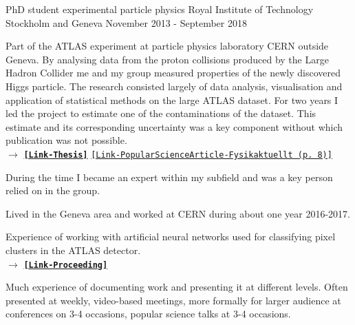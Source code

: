 


\begin{cventries}


\cventry
{PhD student experimental particle physics} %
{Royal Institute of Technology} %
{Stockholm and Geneva} %
{November 2013 - September 2018} %
{ %
\begin{cvitems}
\item {Part of the ATLAS experiment at particle physics laboratory CERN outside Geneva.
By analysing data from the proton collisions produced by the Large Hadron Collider me and my group measured properties of the newly discovered Higgs particle. 
The research consisted largely of data analysis, visualisation and application of statistical methods on the large ATLAS dataset. 
For two years I led the project to estimate one of the contaminations of the dataset.
This estimate and its corresponding uncertainty was a key component without which publication was not possible. \\
$\rightarrow$  \href{http://kth.diva-portal.org/smash/record.jsf?pid=diva2\%3A1244395\&dswid=7018}{{\bf \texttt{[Link-Thesis]}}} \href{http://www.fysikersamfundet.se/wp-content/uploads/Fysikaktuellt3-18_Webb.pdf}{\texttt{[Link-PopularScienceArticle-Fysikaktuellt (p. 8)]}}
}
\item {During the time I became an expert within my subfield and was a key person relied on in the group. 
}
\item {Lived in the Geneva area and worked at CERN during about one year 2016-2017.
}
\item {Experience of working with artificial neural networks used for classifying  pixel clusters in the ATLAS detector.
 \\
$\rightarrow$  \href{https://pos.sissa.it/276/213/pdf}{{\bf \texttt{[Link-Proceeding]}}}
}
\item {Much experience of documenting work and presenting it at different levels.
	Often presented at weekly, video-based meetings, more formally for larger audience at conferences on 3-4 occasions, popular science talks at 3-4 occasions.
}
\end{cvitems}}
\end{cventries}
